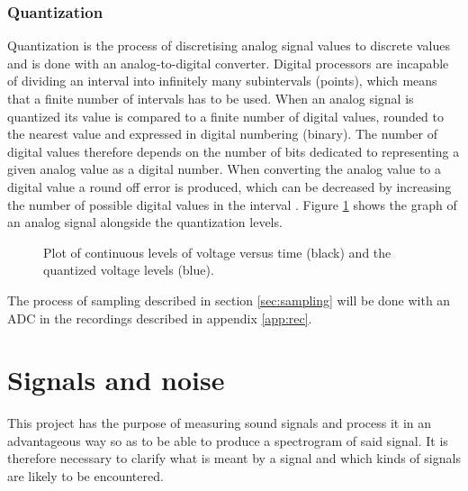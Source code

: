 \subsubsection{Quantization}
Quantization is the process of discretising analog signal values to discrete values and is done with an analog-to-digital converter. Digital processors are incapable of dividing an interval into infinitely many subintervals (points), which means that a finite number of intervals has to be used. When an analog signal is quantized its value is compared to a finite number of digital values, rounded to the nearest value and expressed in digital numbering (binary). The number of digital values therefore depends on the number of bits dedicated to representing a given analog value as a digital number. When converting the analog value to a digital value a round off error is produced, which can be decreased by increasing the number of possible digital values in the interval \cite{pages 91-98, pelgrom}. Figure \ref{fig:quant} shows the graph of an analog signal alongside the quantization levels.
\begin{figure}[H]
\centering
{}
\caption{Plot of continuous levels of voltage versus time (black) and the quantized voltage levels (blue).}
\label{fig:quant}
\end{figure}
The process of sampling described in section \ref{sec:sampling} will be done with an ADC in the recordings described in appendix \ref{app:rec}.

\section{Signals and noise}
This project has the purpose of measuring sound signals and process it in an advantageous way so as to be able to produce a spectrogram of said signal. It is therefore necessary to clarify what is meant by a signal and which kinds of signals are likely to be encountered.

